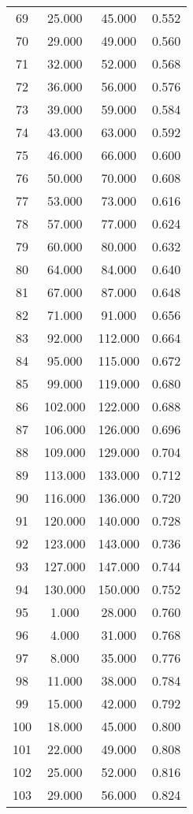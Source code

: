 \begin{tabular}{cccc}
  69 & 25.000 & 45.000 & 0.552 \\ 
  70 & 29.000 & 49.000 & 0.560 \\ 
  71 & 32.000 & 52.000 & 0.568 \\ 
  72 & 36.000 & 56.000 & 0.576 \\ 
  73 & 39.000 & 59.000 & 0.584 \\ 
  74 & 43.000 & 63.000 & 0.592 \\ 
  75 & 46.000 & 66.000 & 0.600 \\ 
  76 & 50.000 & 70.000 & 0.608 \\ 
  77 & 53.000 & 73.000 & 0.616 \\ 
  78 & 57.000 & 77.000 & 0.624 \\ 
  79 & 60.000 & 80.000 & 0.632 \\ 
  80 & 64.000 & 84.000 & 0.640 \\ 
  81 & 67.000 & 87.000 & 0.648 \\ 
  82 & 71.000 & 91.000 & 0.656 \\ 
  83 & 92.000 & 112.000 & 0.664 \\ 
  84 & 95.000 & 115.000 & 0.672 \\ 
  85 & 99.000 & 119.000 & 0.680 \\ 
  86 & 102.000 & 122.000 & 0.688 \\ 
  87 & 106.000 & 126.000 & 0.696 \\ 
  88 & 109.000 & 129.000 & 0.704 \\ 
  89 & 113.000 & 133.000 & 0.712 \\ 
  90 & 116.000 & 136.000 & 0.720 \\ 
  91 & 120.000 & 140.000 & 0.728 \\ 
  92 & 123.000 & 143.000 & 0.736 \\ 
  93 & 127.000 & 147.000 & 0.744 \\ 
  94 & 130.000 & 150.000 & 0.752 \\ 
  95 & 1.000 & 28.000 & 0.760 \\ 
  96 & 4.000 & 31.000 & 0.768 \\ 
  97 & 8.000 & 35.000 & 0.776 \\ 
  98 & 11.000 & 38.000 & 0.784 \\ 
  99 & 15.000 & 42.000 & 0.792 \\ 
  100 & 18.000 & 45.000 & 0.800 \\ 
  101 & 22.000 & 49.000 & 0.808 \\ 
  102 & 25.000 & 52.000 & 0.816 \\ 
  103 & 29.000 & 56.000 & 0.824 \\ 

\end{tabular}
